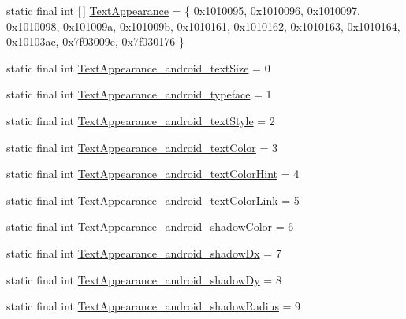 \begin{DoxyCompactItemize}
\item 
static final int \mbox{[}$\,$\mbox{]} \mbox{\hyperlink{classandroid_1_1support_1_1v7_1_1appcompat_1_1_r_1_1styleable_a85d64ca373dd3c60f50e0e9c1a55a8da}{Text\+Appearance}} = \{ 0x1010095, 0x1010096, 0x1010097, 0x1010098, 0x101009a, 0x101009b, 0x1010161, 0x1010162, 0x1010163, 0x1010164, 0x10103ac, 0x7f03009e, 0x7f030176 \}
\item 
static final int \mbox{\hyperlink{classandroid_1_1support_1_1v7_1_1appcompat_1_1_r_1_1styleable_af9f0bc5e4de5b5a13cf249d520135f6b}{Text\+Appearance\+\_\+android\+\_\+text\+Size}} = 0
\item 
static final int \mbox{\hyperlink{classandroid_1_1support_1_1v7_1_1appcompat_1_1_r_1_1styleable_a85b8be9cd5f70a43e5fd407b3048916e}{Text\+Appearance\+\_\+android\+\_\+typeface}} = 1
\item 
static final int \mbox{\hyperlink{classandroid_1_1support_1_1v7_1_1appcompat_1_1_r_1_1styleable_aeacc55fa755882a9ea3f4afe39049916}{Text\+Appearance\+\_\+android\+\_\+text\+Style}} = 2
\item 
static final int \mbox{\hyperlink{classandroid_1_1support_1_1v7_1_1appcompat_1_1_r_1_1styleable_ae130f82b90e33686295a03d11aa6c62f}{Text\+Appearance\+\_\+android\+\_\+text\+Color}} = 3
\item 
static final int \mbox{\hyperlink{classandroid_1_1support_1_1v7_1_1appcompat_1_1_r_1_1styleable_a95f007124181f7ae3915214f019838d8}{Text\+Appearance\+\_\+android\+\_\+text\+Color\+Hint}} = 4
\item 
static final int \mbox{\hyperlink{classandroid_1_1support_1_1v7_1_1appcompat_1_1_r_1_1styleable_ac3a38a44b54e082404e5631714be5d8c}{Text\+Appearance\+\_\+android\+\_\+text\+Color\+Link}} = 5
\item 
static final int \mbox{\hyperlink{classandroid_1_1support_1_1v7_1_1appcompat_1_1_r_1_1styleable_a639281e0d04325662d3d57c7802f03de}{Text\+Appearance\+\_\+android\+\_\+shadow\+Color}} = 6
\item 
static final int \mbox{\hyperlink{classandroid_1_1support_1_1v7_1_1appcompat_1_1_r_1_1styleable_a6b1a196edd622828d89fd8707d72b8c7}{Text\+Appearance\+\_\+android\+\_\+shadow\+Dx}} = 7
\item 
static final int \mbox{\hyperlink{classandroid_1_1support_1_1v7_1_1appcompat_1_1_r_1_1styleable_a6c2a7060369b3c30927869484c276444}{Text\+Appearance\+\_\+android\+\_\+shadow\+Dy}} = 8
\item 
static final int \mbox{\hyperlink{classandroid_1_1support_1_1v7_1_1appcompat_1_1_r_1_1styleable_a96bc2f9cacb559966fb2cc7c9ba2eeec}{Text\+Appearance\+\_\+android\+\_\+shadow\+Radius}} = 9

\end{DoxyCompactItemize}

